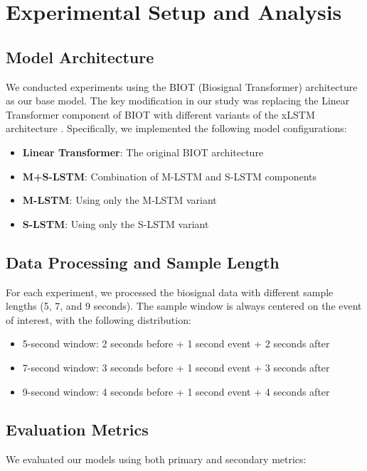 \section{Experimental Setup and Analysis}

\subsection{Model Architecture}
We conducted experiments using the BIOT (Biosignal Transformer) architecture \cite{yang2023biot} as our base model. The key modification in our study was replacing the Linear Transformer component of BIOT with different variants of the xLSTM architecture \cite{beck:24xlstm}. Specifically, we implemented the following model configurations:

\begin{itemize}
    \item \textbf{Linear Transformer}: The original BIOT architecture
    \item \textbf{M+S-LSTM}: Combination of M-LSTM and S-LSTM components
    \item \textbf{M-LSTM}: Using only the M-LSTM variant
    \item \textbf{S-LSTM}: Using only the S-LSTM variant
\end{itemize}

\subsection{Data Processing and Sample Length}
For each experiment, we processed the biosignal data with different sample lengths (5, 7, and 9 seconds). The sample window is always centered on the event of interest, with the following distribution:
\begin{itemize}
    \item 5-second window: 2 seconds before + 1 second event + 2 seconds after
    \item 7-second window: 3 seconds before + 1 second event + 3 seconds after
    \item 9-second window: 4 seconds before + 1 second event + 4 seconds after
\end{itemize}

\subsection{Evaluation Metrics}
We evaluated our models using both primary and secondary metrics:

